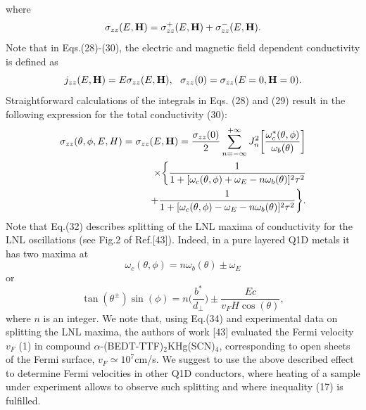\documentclass[prl,aps,showpacs,twocolumn,floatfix]{revtex4}
\begin{document}
where
\begin{equation}
\sigma_{zz}(E,{\bf H})= \sigma^+_{zz}(E,{\bf H}) +
\sigma^-_{zz}(E,{\bf H}).
\end{equation}
Note that in Eqs.(28)-(30), the electric and magnetic field
dependent conductivity is defined as
\begin{equation}
j_{zz}(E,{\bf H}) = E \sigma_{zz}(E,{\bf H}), \ \
\sigma_{zz}(0)=\sigma_{zz}(E=0,{\bf H}=0).
\end{equation}
Straightforward calculations of the integrals in Eqs. (28) and
(29) result in the following expression for the total conductivity
(30):
\begin{eqnarray}
\sigma_{zz}(\theta, \phi,E,H) = \sigma_{zz}(E,{\bf H}) =
\frac{\sigma_{zz}(0)}{2} \sum^{+ \infty}_{n=-\infty} J^2_n
\biggl[\frac{\omega^*_c(\theta,\phi)}{\omega_b (\theta)} \biggl]
\nonumber\\
\times \biggl\{\frac{1}{1+ [\omega_c(\theta,\phi)+ \omega_E - n
\omega_b (\theta)]^2 \tau^2 }
\nonumber\\
+ \frac{1}{1+ [\omega_c(\theta,\phi)- \omega_E - n \omega_b
(\theta)]^2 \tau^2} \biggl\}.
\end{eqnarray}
Note that Eq.(32) describes splitting of the LNL maxima of
conductivity for the LNL oscillations (see Fig.2 of Ref.[43]).
Indeed, in a pure layered Q1D metals it has two maxima at
\begin{equation}
\omega_c(\theta,\phi)= n \omega_b(\theta) \pm  \omega_E
\end{equation}
or
\begin{equation}
\tan(\theta^{\pm}) \sin(\phi)= n \biggl( \frac{b^*}{d_{\perp}}
\biggl) \pm \frac{E c}{v_F H \cos(\theta)},
\end{equation}
where $n$ is an integer. We note that, using Eq.(34) and
experimental data on splitting the LNL maxima, the authors of work
[43] evaluated the Fermi velocity $v_F$ (1) in compound
$\alpha$-(BEDT-TTF)$_2$KHg(SCN)$_4$, corresponding to open sheets
of the Fermi surface, $v_F \simeq 10^7$cm/s. We suggest to use the
above described effect to determine Fermi velocities in other Q1D
conductors, where heating of a sample under experiment allows to
observe such splitting and where inequality (17) is fulfilled.
\end{document}
